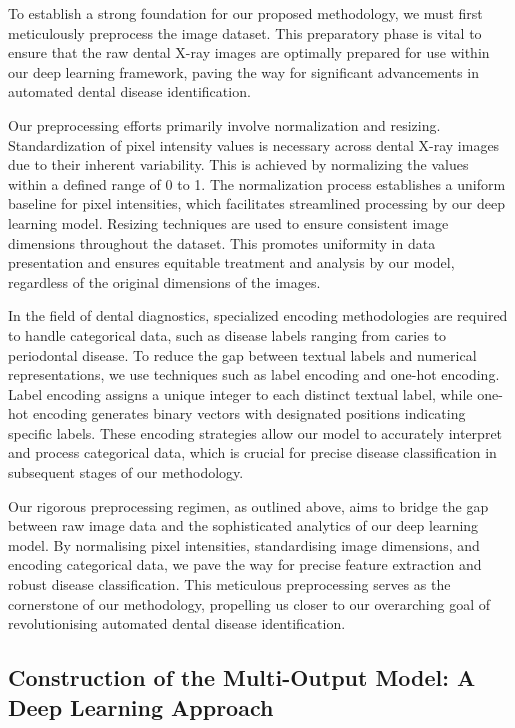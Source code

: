 \documentclass[journal,twoside,web]{ieeecolor}
\begin{document}
To establish a strong foundation for our proposed methodology, we must first meticulously preprocess the image dataset. This preparatory phase is vital to ensure that the raw dental X-ray images are optimally prepared for use within our deep learning framework, paving the way for significant advancements in automated dental disease identification.

Our preprocessing efforts primarily involve normalization and resizing. Standardization of pixel intensity values is necessary across dental X-ray images due to their inherent variability. This is achieved by normalizing the values within a defined range of 0 to 1. The normalization process establishes a uniform baseline for pixel intensities, which facilitates streamlined processing by our deep learning model. Resizing techniques are used to ensure consistent image dimensions throughout the dataset. This promotes uniformity in data presentation and ensures equitable treatment and analysis by our model, regardless of the original dimensions of the images.

In the field of dental diagnostics, specialized encoding methodologies are required to handle categorical data, such as disease labels ranging from caries to periodontal disease. To reduce the gap between textual labels and numerical representations, we use techniques such as label encoding and one-hot encoding. Label encoding assigns a unique integer to each distinct textual label, while one-hot encoding generates binary vectors with designated positions indicating specific labels. These encoding strategies allow our model to accurately interpret and process categorical data, which is crucial for precise disease classification in subsequent stages of our methodology.

Our rigorous preprocessing regimen, as outlined above, aims to bridge the gap between raw image data and the sophisticated analytics of our deep learning model. By normalising pixel intensities, standardising image dimensions, and encoding categorical data, we pave the way for precise feature extraction and robust disease classification. This meticulous preprocessing serves as the cornerstone of our methodology, propelling us closer to our overarching goal of revolutionising automated dental disease identification.


\subsection{Construction of the Multi-Output Model: A Deep Learning Approach}
\end{document}
